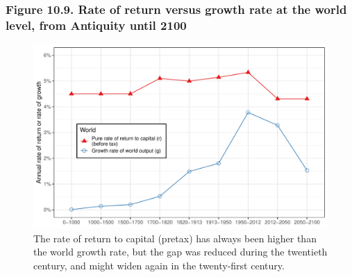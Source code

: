 \documentclass[t]{beamer}\usepackage[]{graphicx}\usepackage[]{color}
\newenvironment{knitrout}{}{} %
\begin{document}
\begin{frame}[label=Figure_10_9]
\frametitle{Figure 10.9. Rate of return versus growth rate at the world level, from Antiquity until 2100}
\begin{figure}[t]
\begin{minipage}[b]{\textwidth}
\centering
\begin{knitrout}\footnotesize
{}\color{fgcolor}

{\centering \includegraphics[width=1\linewidth]{figures/color/Figure_10_9} 

}



\end{knitrout}
\caption{The rate of return to capital (pretax) has always been higher than the world growth rate, but the gap was reduced during the twentieth century, and might widen again in the twenty-first century.}
\end{minipage}
\end{figure}
\end{frame}
\end{document}
